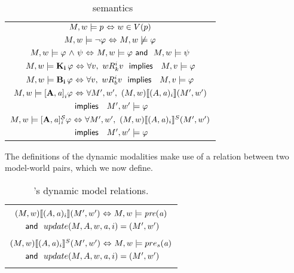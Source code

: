 \begin{table}[H]
	\begin{center}
	\begin{tabular}{| c |}
		\hline	

	$M,w \models p  {\ \Leftrightarrow \ } w \in V(p)$ \\
	$M,w \models {\neg} \varphi  {\ \Leftrightarrow \ } M,w \not\models \varphi$ \\ 
	$M,w \models \varphi {\ \wedge \ } \psi {\ \Leftrightarrow \ } M,w \models \varphi \textsf{\ and \ } M,w \models \psi$ \\
	$M,w \models \mathbf{K}_{\mathbf{i}}\,\varphi {\ \Leftrightarrow \ } \forall v,\ wR_{k}^i v\ \textsf{\ implies \ }\ M,v \models \varphi$ \\
	$M,w \models \mathbf{B}_{\mathbf{i}}\,\varphi {\ \Leftrightarrow \ } \forall v,\ wR_{b}^i v\ \textsf{\ implies \ }\ M,v \models \varphi$ \\
	$M,w \models \mathbf{[A,\mathit{a}]}_i\varphi {\ \Leftrightarrow \ } \forall M',w',\  (M,w) \llbracket (A,\mathit{a})_i \rrbracket (M',w')$ \\ $\timplies\ M',w' \models \varphi$ \\
	$M,w \models \mathbf{[A,\mathit{a}]_{\mathit{i}}^\mathcal{S}}\varphi {\ \Leftrightarrow \ } \forall M',w',\  (M,w) \llbracket (A,\mathit{a})_i \rrbracket^S (M',w')$ \\ $\timplies\ M',w' \models \varphi$\\
	\hline 
	\end{tabular}
	\caption{\DASL\ semantics}
	\end{center}
\end{table}
The definitions of the dynamic modalities make use of a relation between two model-world pairs, which we now define.
\begin{table}[H]
	\begin{center}
		\begin{tabular}{|c|}
	\hline
	\\
	$(M,w)\llbracket (A,\mathit{a})_i\rrbracket (M',w') {\ \Leftrightarrow \ } M,w \models \mathit{pre}(\mathit{a})$ \\ $\textsf{\ and \ } update(M,A,w,\mathit{a},i) = (M',w')$ \\
	\\
	$(M,w)\llbracket (A,\mathit{a})_i \rrbracket^S (M',w') {\ \Leftrightarrow \ } M,w \models pre_s(\mathit{a})$ \\ $\textsf{\ and \ } update(M,A,w,\mathit{a},i) = (M',w')$\\
	\\
	\hline 
		\end{tabular}
	\caption{\DASL's dynamic model relations.}
	\end{center}
\end{table}




